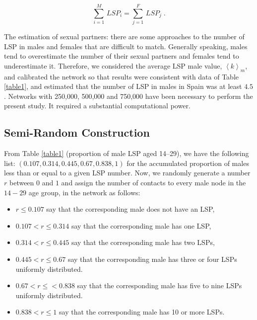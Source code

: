 \begin{equation}
\label{nodeseq}
\displaystyle\sum_{i=1}^M\, LSP_i=\displaystyle\sum_{j=1}^F\, LSP_j\; .
\end{equation}

The estimation of sexual partners: there are some approaches to the number of LSP in males and females \cite{USA,USA2} that are difficult to match. Generally speaking, males tend to overestimate the number of their sexual partners and females tend to underestimate it. Therefore, we considered the average LSP male value, $\left\langle k \right\rangle_m$, and calibrated the network so that results were consistent with data of Table \ref{table1}, and estimated that the number of LSP in males in Spain was at least $4.5$. Networks with 250,000, 500,000 and 750,000 have been necessary to perform the present study. It required a substantial computational power.

\subsection{Semi-Random Construction}
\label{subsec22}

From Table \ref{table1} (proportion of male LSP aged 14--29), we have the following list:
$( 0.107, 0.314, 0.445, 0.67, 0.838, 1)$ for the accumulated proportion of males less than or equal to a given LSP number.
Now, we randomly generate a number $r$ between $0$ and $1$ and assign the number of contacts to every male node in the $14-29$
age group, in the network as follows:

\begin{itemize}[leftmargin=*,labelsep=5mm]
\item $r \le 0.107$ say that the corresponding male does not have an LSP,
\item $0.107 < r \le 0.314$ say that the corresponding male has one LSP,
\item $0.314 < r \le 0.445$ say that the corresponding male has two LSPs,
\item $0.445 < r \le 0.67$  say that the corresponding male has three or four LSPs uniformly distributed.
\item $0.67 < r \le < 0.838$ say that the corresponding male has five to nine LSPs uniformly distributed.
\item $0.838 < r \le 1$ say that the corresponding male has 10 or more LSPs.
\end{itemize}

